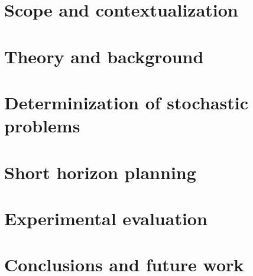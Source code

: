 \documentclass[11pt,a4paper,oldfontcommands,oneside]{memoir}
\begin{document}



\cleardoublepage


\cleardoublepage



\cleardoublepage


\setcounter{secnumdepth}{2}
\setcounter{tocdepth}{2}

\tableofcontents

\cleardoublepage


%

\chapter{Scope and contextualization}


\chapter{Theory and background}


\chapter{Determinization of stochastic problems}


\chapter{Short horizon planning}


\chapter{Experimental evaluation}


\chapter{Conclusions and future work}


\printbibliography
\end{document}
